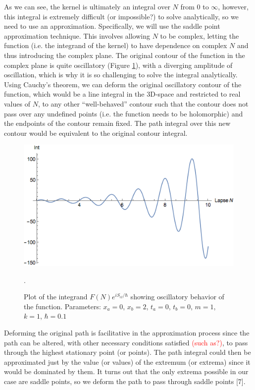 \documentclass[12pt]{revtex4}
\newcommand{\red}{\textcolor{red}}
\begin{document}
As we can see, the kernel is ultimately an integral over $N$ from 0 to $\infty$, however, this integral is extremely difficult (or impossible?) to solve analytically, so we need to use an approximation. Specifically, we will use the saddle point approximation technique. This involves allowing $N$ to be complex, letting the function (i.e. the integrand of the kernel) to have dependence on complex $N$ and thus introducing the complex plane. The original contour of the function in the complex plane is quite oscillatory (Figure \ref{fig:intplot}), with a diverging amplitude of oscillation, which is why it is so challenging to solve the integral analytically. Using Cauchy's theorem, we can deform the original oscillatory contour of the function, which would be a line integral in the 3D-space and restricted to real values of $N$, to any other ``well-behaved'' contour such that the contour does not pass over any undefined points (i.e. the function needs to be holomorphic) and the endpoints of the contour remain fixed. The path integral over this new contour would be equivalent to the original contour integral.

\begin{figure}[h]
	\centering
	\includegraphics[width=0.7\linewidth]{integrandplot}
	\caption{Plot of the integrand $F(N) e^{i S_{cl}/\hbar}$ showing oscillatory behavior of the function. Parameters: $x_a=0$, $x_b=2$, $t_a=0$, $t_b=0$, $m=1$, $k=1$, $\hbar=0.1$}.
	\label{fig:intplot}
\end{figure}
Deforming the original path is facilitative in the approximation process since the path can be altered, with other necessary conditions satisfied \red{(such as?)}, to pass through the highest stationary point (or points). The path integral could then be approximated just by the value (or values) of the extremum (or extrema) since it would be dominated by them. It turns out that the only extrema possible in our case are saddle points, so we deform the path to pass through saddle points [7]. 
\end{document}
